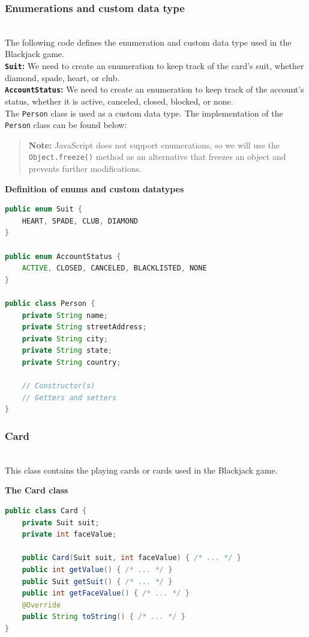 \subsubsection{Enumerations and custom data type}\label{GriG8ycdNvZ6AOmRI7YuW}
\\
The following code defines the enumeration and custom data type used in the Blackjack game.
\\
\textbf{\texttt{Suit}:} We need to create an enumeration to keep track of the card's suit, whether diamond, spade, heart, or club.
\\
\textbf{\texttt{AccountStatus}:} We need to create an enumeration to keep track of the account's status, whether it is active, canceled, closed, blocked, or none.
\\
The \texttt{Person} class is used as a custom data type. The implementation of the \texttt{Person} class can be found below:
\begin{quote}
\textbf{Note:} JavaScript does not support enumerations, so we will use the \texttt{Object.freeze()} method as an alternative that freezes an object and prevents further modifications.
\end{quote}

\textbf{Definition of enums and custom datatypes}

\begin{lstlisting}[language=Java]
public enum Suit {
    HEART, SPADE, CLUB, DIAMOND
}

public enum AccountStatus {
    ACTIVE, CLOSED, CANCELED, BLACKLISTED, NONE
}

public class Person {
    private String name;
    private String streetAddress;
    private String city;
    private String state;
    private String country;

    // Constructor(s)
    // Getters and setters
}
\end{lstlisting}

\subsubsection{Card}\label{mn3zfNeJYir-RBT9xIj9B}
\\
This class contains the playing cards or cards used in the Blackjack game.

\textbf{The Card class}

\begin{lstlisting}[language=Java]
public class Card {
    private Suit suit;
    private int faceValue;

    public Card(Suit suit, int faceValue) { /* ... */ }
    public int getValue() { /* ... */ }
    public Suit getSuit() { /* ... */ }
    public int getFaceValue() { /* ... */ }
    @Override
    public String toString() { /* ... */ }
}
\end{lstlisting}

